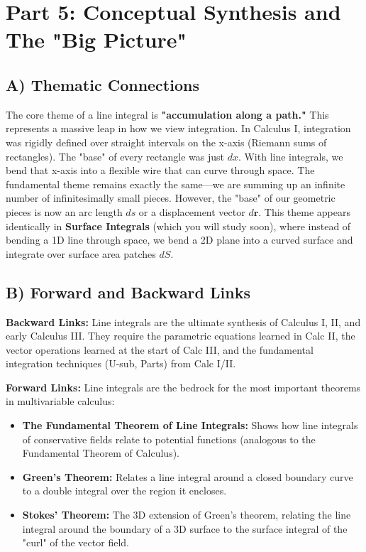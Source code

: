 \documentclass{article}
\begin{document}
\newpage

\section{Part 5: Conceptual Synthesis and The "Big Picture"}

\subsection{A) Thematic Connections}
The core theme of a line integral is \textbf{"accumulation along a path."} This represents a massive leap in how we view integration.
In Calculus I, integration was rigidly defined over straight intervals on the x-axis (Riemann sums of rectangles). The "base" of every rectangle was just $dx$.
With line integrals, we bend that x-axis into a flexible wire that can curve through space. The fundamental theme remains exactly the same—we are summing up an infinite number of infinitesimally small pieces. However, the "base" of our geometric pieces is now an arc length $ds$ or a displacement vector $d\mathbf{r}$.
This theme appears identically in \textbf{Surface Integrals} (which you will study soon), where instead of bending a 1D line through space, we bend a 2D plane into a curved surface and integrate over surface area patches $dS$. 

\subsection{B) Forward and Backward Links}
\textbf{Backward Links:} Line integrals are the ultimate synthesis of Calculus I, II, and early Calculus III. They require the parametric equations learned in Calc II, the vector operations learned at the start of Calc III, and the fundamental integration techniques (U-sub, Parts) from Calc I/II. 

\textbf{Forward Links:} Line integrals are the bedrock for the most important theorems in multivariable calculus:
\begin{itemize}
    \item \textbf{The Fundamental Theorem of Line Integrals:} Shows how line integrals of conservative fields relate to potential functions (analogous to the Fundamental Theorem of Calculus).
    \item \textbf{Green's Theorem:} Relates a line integral around a closed boundary curve to a double integral over the region it encloses.
    \item \textbf{Stokes' Theorem:} The 3D extension of Green's theorem, relating the line integral around the boundary of a 3D surface to the surface integral of the "curl" of the vector field. 
\end{itemize}
\end{document}
